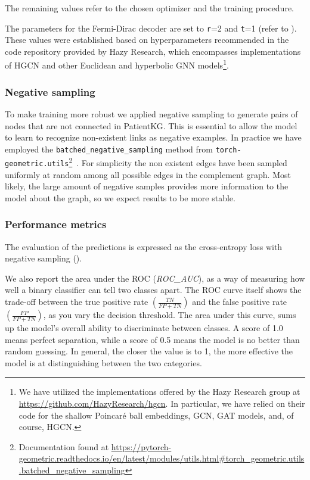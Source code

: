 The remaining values refer to the chosen optimizer and the training procedure.

The parameters for the Fermi-Dirac decoder are set to \texttt{r}=2 and \texttt{t}=1 (refer to ). These values were established based on hyperparameters recommended in the code repository provided by Hazy Research, which encompasses implementations of HGCN and other Euclidean and hyperbolic GNN models\footnote{We have utilized the implementations offered by the Hazy Research group at \url{https://github.com/HazyResearch/hgcn}. In particular, we have relied on their code for the shallow Poincaré ball embeddings, GCN, GAT models, and, of course, HGCN.}. 

\subsubsection{Negative sampling}
To make training more robust we applied negative sampling to generate pairs of nodes that are not connected in PatientKG. This is essential to allow the model to learn to recognize non-existent links as negative examples. In practice we have employed the \texttt{batched\_negative\_sampling} method from \texttt{torch-geometric.utils}\footnote{Documentation found at \url{https://pytorch-geometric.readthedocs.io/en/latest/modules/utils.html\#torch\_geometric.utils.batched\_negative\_sampling}}~\cite{fey2019pytorchGeometric}. For simplicity the non existent edges have been sampled uniformly at random among all possible edges in the complement graph. Most likely, the large amount of negative samples provides more information to the model about the graph, so we expect results to be more stable.

\subsubsection{Performance metrics}\label{sec:performanceMetrics}
The evaluation of the predictions is expressed as the cross-entropy loss with negative sampling (). 

We also report the area under the ROC (\emph{ROC\_AUC}), as a way of measuring how well a binary classifier can tell two classes apart. The ROC curve itself shows the trade-off between the true positive rate $\left(\frac{TN}{FP+TN}\right)$ and the false positive rate $\left(\frac{FP}{FP+TN}\right)$, as you vary the decision threshold. The area under this curve, sums up the model's overall ability to discriminate between classes. A score of 1.0 means perfect separation, while a score of 0.5 means the model is no better than random guessing. In general, the closer the value is to 1, the more effective the model is at distinguishing between the two categories.

